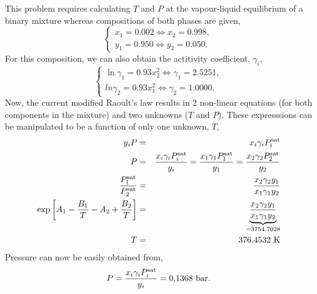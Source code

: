 \begin{enumerate}[1)]
        This problem requires calculating $T$ and $P$ at the vapour-liquid equilibrium of a binary mixture whereas compositions of both phases are given,
            \begin{displaymath}
               \begin{cases}
                  x_{1} = 0.002 \Leftrightarrow x_{2} = 0.998,\\
                  y_{1} = 0.950 \Leftrightarrow y_{2} = 0.050.
               \end{cases}
            \end{displaymath}
            For this composition, we can also obtain the actitivity coefficient, $\gamma_{i}$,
            \begin{displaymath}
               \begin{cases}
                  \ln{\gamma_{1}} = 0.93x_{2}^{2} \Leftrightarrow \gamma_{1} = 2.5251,\\
                   ln{\gamma_{2}} = 0.93x_{1}^{2} \Leftrightarrow \gamma_{2} = 1.0000.
               \end{cases}
            \end{displaymath}
            Now, the current modified Raoult's law results in 2 non-linear equations (for both components in the mixture) and two unknowns ($T$ and $P$). These expresssions can be manipulated to be a function of only one unknown, $T$,
            \begin{eqnarray}
                y_{i} P &=& x_{i}\gamma_{i}P_{i}^{\text{sat}} \nonumber \\
                     P &=& \displaystyle\frac{x_{i}\gamma_{i}P_{i}^{\text{sat}}}{y_{i}} =  \displaystyle\frac{x_{1}\gamma_{1}P_{1}^{\text{sat}}}{y_{1}} = \displaystyle\frac{x_{2}\gamma_{2}P_{2}^{\text{sat}}}{y_{2}} \nonumber \\
                \displaystyle\frac{P_{1}^{\text{sat}}}{P_{2}^{\text{sat}}}  &=& \displaystyle\frac{x_{2}\gamma_{2}y_{1}}{x_{1}\gamma_{1}y_{2}} \nonumber \\
                \exp{\left[A_{1}-\displaystyle\frac{B_{1}}{T}-A_{2}+\displaystyle\frac{B_{2}}{T}\right]} &=& \underbrace{\displaystyle\frac{x_{2}\gamma_{2}y_{1}}{x_{1}\gamma_{1}y_{2}}}_{= 3754.7028} \nonumber \\
                         T&=& 376.4532\text{ K} \nonumber
            \end{eqnarray}
            Pressure can now be easily obtained from,
            \begin{displaymath}
                 P = \displaystyle\frac{x_{i}\gamma_{i}P_{i}^{\text{sat}}}{y_{i}} = 0.1368\text{ bar}.
            \end{displaymath}
            

\end{enumerate}
